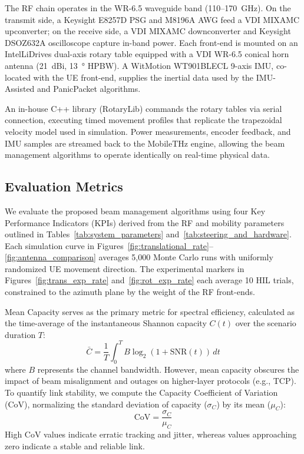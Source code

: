 \documentclass[fleqn,10pt]{wlscirep}
\begin{document}
The RF chain operates in the WR-6.5 waveguide band (110--170~GHz). On the transmit side, a Keysight E8257D PSG and M8196A AWG feed a VDI MIXAMC upconverter; on the receive side, a VDI MIXAMC downconverter and Keysight DSOZ632A oscilloscope capture in-band power. Each front-end is mounted on an IntelLiDrives dual-axis rotary table equipped with a VDI WR-6.5 conical horn antenna (\SI{21}{dBi}, \SI{13}{\degree} HPBW). A WitMotion WT901BLECL 9-axis IMU, co-located with the UE front-end, supplies the inertial data used by the IMU-Assisted and PanicPacket algorithms.

An in-house C++ library (RotaryLib) commands the rotary tables via serial connection, executing timed movement profiles that replicate the trapezoidal velocity model used in simulation. Power measurements, encoder feedback, and IMU samples are streamed back to the MobileTHz engine, allowing the beam management algorithms to operate identically on real-time physical data.


\subsection*{Evaluation Metrics}
We evaluate the proposed beam management algorithms using four Key Performance Indicators (KPIs) derived from the RF and mobility parameters outlined in Tables~\ref{tab:system_parameters} and~\ref{tab:steering_and_hardware}. Each simulation curve in Figures~\ref{fig:translational_rate}--\ref{fig:antenna_comparison} averages 5{,}000 Monte Carlo runs with uniformly randomized UE movement direction. The experimental markers in Figures~\ref{fig:trans_exp_rate} and~\ref{fig:rot_exp_rate} each average 10 HIL trials, constrained to the azimuth plane by the weight of the RF front-ends.

Mean Capacity serves as the primary metric for spectral efficiency, calculated as the time-average of the instantaneous Shannon capacity $C(t)$ over the scenario duration $T$:
\begin{equation}
    \bar{C} = \frac{1}{T} \int_{0}^{T} B \log_2(1 + \text{SNR}(t)) \, dt
\end{equation}
where $B$ represents the channel bandwidth. However, mean capacity obscures the impact of beam misalignment and outages on higher-layer protocols (e.g., TCP). To quantify link stability, we compute the Capacity Coefficient of Variation (CoV), normalizing the standard deviation of capacity ($\sigma_C$) by its mean ($\mu_C$):
\begin{equation}
    \text{CoV} = \frac{\sigma_C}{\mu_C}
\end{equation}
High CoV values indicate erratic tracking and jitter, whereas values approaching zero indicate a stable and reliable link.
\end{document}
